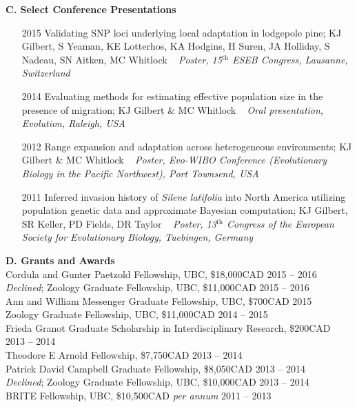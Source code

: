 \noindent \textbf{C.  Select Conference Presentations}
\begin{enumerate}[nolistsep]

\item[2015] Validating SNP loci underlying local adaptation in lodgepole pine; KJ Gilbert, S Yeaman, KE Lotterhos, KA Hodgins, H Suren, JA Holliday, S Nadeau, SN Aitken, MC Whitlock ~ \emph{Poster, 15$^{\textrm{th}}$ ESEB Congress, Lausanne, Switzerland}
	
\item[2014] Evaluating methods for estimating effective population size in the presence of migration; KJ Gilbert \& MC Whitlock ~ \emph{Oral presentation, Evolution, Raleigh, USA}

\item[2012] Range expansion and adaptation across heterogeneous environments; KJ Gilbert \& MC Whitlock ~ \emph{Poster, Evo-WIBO Conference (Evolutionary Biology in the Pacific Northwest), Port Townsend, USA}

\item[2011] Inferred invasion history of \emph{Silene latifolia} into North America utilizing population genetic data and approximate Bayesian computation; KJ Gilbert, SR Keller, PD Fields, DR Taylor ~ \emph{Poster, 13$^{\textrm{th}}$ Congress of the European Society for Evolutionary Biology, Tuebingen, Germany}

\end{enumerate}	
	
\vspace{6pt}	

\noindent
\textbf{D.  Grants and Awards}\\
\textmd{Cordula and Gunter Paetzold Fellowship, UBC, \$18,000CAD} \hfill {2015 -- 2016}\\
\textmd{\emph{Declined}; Zoology Graduate Fellowship, UBC, \$11,000CAD} \hfill {2015 -- 2016}\\
\textmd{Ann and William Messenger Graduate Fellowship, UBC, \$700CAD} \hfill {2015}\\
\textmd{Zoology Graduate Fellowship, UBC, \$11,000CAD} \hfill {2014 -- 2015}\\
\textmd{Frieda Granot Graduate Scholarship in Interdisciplinary Research, \$200CAD} \hfill {2013 -- 2014}\\
\textmd{Theodore E Arnold Fellowship, \$7,750CAD} \hfill {2013 -- 2014}\\
\textmd{Patrick David Campbell Graduate Fellowship, \$8,050CAD} \hfill {2013 -- 2014}\\
\textmd{\emph{Declined}; Zoology Graduate Fellowship, UBC, \$10,000CAD} \hfill {2013 -- 2014}\\
\textmd{BRITE Fellowship, UBC, \$10,500CAD \emph{per annum}} \hfill {2011 -- 2013}\\

